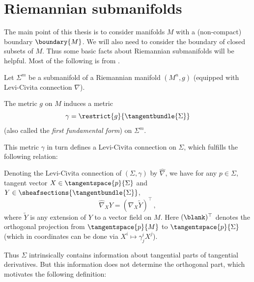 \documentclass[titlepage,numbers=noenddot,oneside,%
cleardoublepage=empty,paper=a4,fontsize=11pt,%
english,%
]{scrartcl}
\newcommand*{\mathcomma}{\,,}
\newcommand*{\mathfullstop}{\,.}
\begin{document}
\section{Riemannian submanifolds}\label{sec:riemannian_submanifolds}

The main point of this thesis is to consider manifolds \( M \) with a (non-compact) boundary \( \boundary{M} \). We will also need to consider the boundary of closed subsets of \( M \). Thus some basic facts about Riemannian submanifolds will be helpful. Most of the following is from \cite[Chapter~2.1]{leeGeometricRelativity2019}.

{ \newcommand{\Mconnection}{\nabla}\newcommand{\Sigmaconnection}{\hat{\nabla}}
Let \( \Sigma^m \) be a submanifold of a Riemannian manifold \( (M^n,g) \) (equipped with Levi-Civita connection \( \Mconnection \)).
\begin{remark}
    The metric \( g  \) on \( M \) induces a metric
    \begin{equation}
        \gamma=\restrict{g}{\tangentbundle{\Sigma}}\label{eq:first_fundamental_form}
    \end{equation} 
    (also called the \emph{first fundamental form}) on \( \Sigma^m  \). 
\end{remark}
This metric \( \gamma \) in turn defines a Levi-Civita connection on \( \Sigma \), which fulfills the following relation:
\begin{fact}
  Denoting the Levi-Civita connection of \( (\Sigma,\gamma) \) by \( \Sigmaconnection \), we have for any \( p\in \Sigma \), tangent vector \( X\in \tangentspace{p}{\Sigma} \) and \( Y\in \sheafsections{\tangentbundle{\Sigma}} \),
  \begin{equation*}
    \Sigmaconnection_X Y=(\Mconnection_X \tilde{Y})^\top\mathcomma
  \end{equation*}
  where \( \tilde{Y} \) is any extension of \( Y \) to a vector field on \( M \). Here \( (\blank)^\top \) denotes the orthogonal projection from \( \tangentspace{p}{M} \) to \( \tangentspace{p}{\Sigma} \) (which in coordinates can be done via \( X^i\mapsto \gamma^i_j X^j \)).
\end{fact}
Thus \( \Sigma \) intrinsically contains information about tangential parts of tangential derivatives. But this information does not determine the orthogonal part, which motivates the following definition:
}
\end{document}
